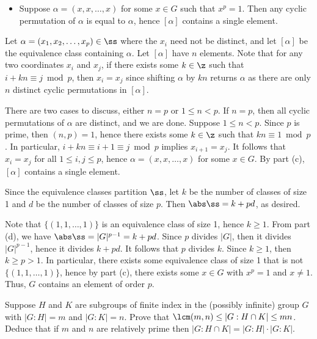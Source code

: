 \begin{solalph}
\begin{itemize}
        \item[\leftimp] Suppose $\alpha = (x, x, \dots, x)$ for some $x \in G$ such that $x^p = 1$. Then any cyclic permutation of $\alpha$ is equal to $\alpha$, hence $[\alpha]$ contains a single element.
    \end{itemize}
    \item Let $\alpha = (x_1, x_2, \dots, x_p) \in \ss$ where the $x_i$ need not be distinct, and let $[\alpha]$ be the equivalence class containing $\alpha$. Let $[\alpha]$ have $n$ elements. Note that for any two coordinates $x_i$ and $x_j$, if there exists some $k \in \z$ such that $i + kn \equiv j \bmod p$, then $x_i = x_j$ since shifting $\alpha$ by $kn$ returns $\alpha$ as there are only $n$ distinct cyclic permutations in $[\alpha]$.
    
    There are two cases to discuss, either $n = p$ or $1 \leq n < p$. If $n = p$, then all cyclic permutations of $\alpha$ are distinct, and we are done. Suppose $1 \leq n < p$. Since $p$ is prime, then $(n, p) = 1$, hence there exists some $k \in \z$ such that $kn \equiv 1 \bmod p$. In particular, $i + kn \equiv i + 1 \equiv j \bmod p$ implies $x_{i + 1} = x_j$. It follows that $x_i = x_j$ for all $1 \leq i, j \leq p$, hence $\alpha = (x, x, \dots, x)$ for some $x \in G$. By part (c), $[\alpha]$ contains a single element.

    Since the equivalence classes partition $\ss$, let $k$ be the number of classes of size 1 and $d$ be the number of classes of size $p$. Then $\abs\ss = k + pd$, as desired.
    \item Note that $\{(1, 1, \dots, 1)\}$ is an equivalence class of size 1, hence $k \geq 1$. From part (d), we have $\abs\ss = |G|^{p-1} = k + pd$. Since $p$ divides $|G|$, then it divides $|G|^{p-1}$, hence it divides $k + pd$. It follows that $p$ divides $k$. Since $k \geq 1$, then $k \geq p > 1$. In particular, there exists some equivalence class of size 1 that is not $\{(1, 1, \dots, 1)\}$, hence by part (c), there exists some $x \in G$ with $x^p = 1$ and $x \neq 1$. Thus, $G$ contains an element of order $p$.
\end{solalph}

\begin{specialexercise}\label{ex3.2.10}
    Suppose $H$ and $K$ are subgroups of finite index in the (possibly infinite) group $G$ with $|G : H| = m$ and $|G : K| = n$. Prove that $\lcm(m, n) \leq |G : H \cap K| \leq mn$. Deduce that if $m$ and $n$ are relatively prime then $|G : H \cap K| = |G : H| \cdot |G : K|$.
\end{specialexercise}


